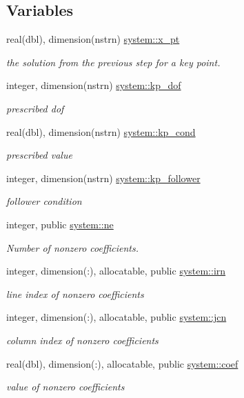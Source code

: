 \subsection*{Variables}
\begin{DoxyCompactItemize}
\item 
real(dbl), dimension(nstrn) \hyperlink{namespacesystem_a9db5b0f39df1dc763bd7885fa9f4389d}{system\+::x\+\_\+pt}
\begin{DoxyCompactList}\small\item\em the solution from the previous step for a key point. \end{DoxyCompactList}\item 
integer, dimension(nstrn) \hyperlink{namespacesystem_a1ec6fa7d33c56b907f960706f2c49a97}{system\+::kp\+\_\+dof}
\begin{DoxyCompactList}\small\item\em prescribed dof \end{DoxyCompactList}\item 
real(dbl), dimension(nstrn) \hyperlink{namespacesystem_a52739e5016f753e4d31c5f933aa2b79a}{system\+::kp\+\_\+cond}
\begin{DoxyCompactList}\small\item\em prescribed value \end{DoxyCompactList}\item 
integer, dimension(nstrn) \hyperlink{namespacesystem_af7b15e252e65635b4d03452e4c717697}{system\+::kp\+\_\+follower}
\begin{DoxyCompactList}\small\item\em follower condition \end{DoxyCompactList}\item 
integer, public \hyperlink{namespacesystem_a8c97c1868622a50b42869db23d0a2f11}{system\+::ne}
\begin{DoxyCompactList}\small\item\em Number of nonzero coefficients. \end{DoxyCompactList}\item 
integer, dimension(\+:), allocatable, public \hyperlink{namespacesystem_af8a50eade1073ff9c211526848dcec38}{system\+::irn}
\begin{DoxyCompactList}\small\item\em line index of nonzero coefficients \end{DoxyCompactList}\item 
integer, dimension(\+:), allocatable, public \hyperlink{namespacesystem_a32a5c04fae61a0d6a90727cd0bab43a7}{system\+::jcn}
\begin{DoxyCompactList}\small\item\em column index of nonzero coefficients \end{DoxyCompactList}\item 
real(dbl), dimension(\+:), allocatable, public \hyperlink{namespacesystem_ac5c6f08d5a21faff727c9a1240bae697}{system\+::coef}
\begin{DoxyCompactList}\small\item\em value of nonzero coefficients \end{DoxyCompactList}\end{DoxyCompactItemize}


